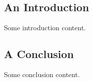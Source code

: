 \documentclass{article}
\title{}
\date{\displaydate{articleDate}}
\author{\bfseries Rohan Scott Byrne\mdseries\\}
\begin{document}
\maketitle

\subsection{An Introduction}

Some introduction content.

\subsection{A Conclusion}

Some conclusion content.
\end{document}
